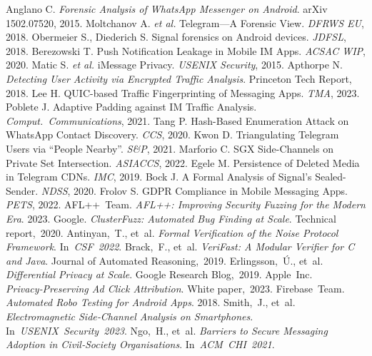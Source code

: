 \documentclass[a4paper,12pt]{report}
\begin{document}
\begin{thebibliography}{99}
     Anglano C. \textit{Forensic Analysis of WhatsApp Messenger on Android}. arXiv 1502.07520, 2015.
 Moltchanov A. \emph{et al.} Telegram—A Forensic View. \textit{DFRWS EU}, 2018.
 Obermeier S., Diederich S. Signal forensics on Android devices. \textit{JDFSL}, 2018.
 Berezowski T. Push Notification Leakage in Mobile IM Apps. \textit{ACSAC WIP}, 2020.
 Matic S. \emph{et al.} iMessage Privacy. \textit{USENIX Security}, 2015.
 Apthorpe N. \textit{Detecting User Activity via Encrypted Traffic Analysis}. Princeton Tech Report, 2018.
 Lee H. QUIC-based Traffic Fingerprinting of Messaging Apps. \textit{TMA}, 2023.
 Poblete J. Adaptive Padding against IM Traffic Analysis. \textit{Comput.\ Communications}, 2021.
 Tang P. Hash-Based Enumeration Attack on WhatsApp Contact Discovery. \textit{CCS}, 2020.
 Kwon D. Triangulating Telegram Users via “People Nearby”. \textit{S\&P}, 2021.
 Marforio C. SGX Side-Channels on Private Set Intersection. \textit{ASIACCS}, 2022.
 Egele M. Persistence of Deleted Media in Telegram CDNs. \textit{IMC}, 2019.
 Bock J. A Formal Analysis of Signal’s Sealed-Sender. \textit{NDSS}, 2020.
 Frolov S. GDPR Compliance in Mobile Messaging Apps. \textit{PETS}, 2022.
 AFL++ Team. \emph{AFL++: Improving Security Fuzzing for the Modern Era}. 2023.
 Google. \emph{ClusterFuzz: Automated Bug Finding at Scale}. Technical report, 2020.
 Antinyan, T., et al. \emph{Formal Verification of the Noise Protocol Framework}. In \textit{CSF 2022}.
 Brack, F., et al. \emph{VeriFast: A Modular Verifier for C and Java}. Journal of Automated Reasoning, 2019.
 Erlingsson, Ú., et al. \emph{Differential Privacy at Scale}. Google Research Blog, 2019.
 Apple Inc. \emph{Privacy‑Preserving Ad Click Attribution}. White paper, 2023.
 Firebase Team. \emph{Automated Robo Testing for Android Apps}. 2018.
 Smith, J., et al. \emph{Electromagnetic Side‑Channel Analysis on Smartphones}. In \textit{USENIX Security 2023}.
 Ngo, H., et al. \emph{Barriers to Secure Messaging Adoption in Civil‑Society Organisations}. In \textit{ACM CHI 2021}.
\end{thebibliography}
\clearpage
\end{document}
